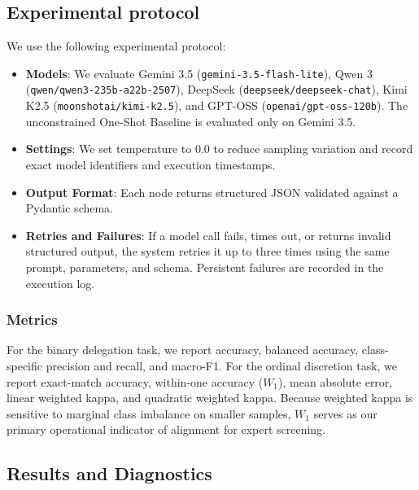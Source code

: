 \documentclass[runningheads]{llncs}
\begin{document}
\subsection{Experimental protocol}

We use the following experimental protocol:
\begin{itemize}[nosep]
    \raggedright
    \item \textbf{Models}: We evaluate Gemini 3.5 (\texttt{gemini-3.5-flash-lite}), Qwen 3 (\texttt{qwen/qwen3-235b-a22b-2507}), DeepSeek (\texttt{deepseek/deepseek-chat}), Kimi K2.5 (\texttt{moonshotai/kimi-k2.5}), and GPT-OSS (\texttt{openai/gpt-oss-120b}). The unconstrained One-Shot Baseline is evaluated only on Gemini 3.5.
    
    \item \textbf{Settings}: We set temperature to 0.0 to reduce sampling variation and record exact model identifiers and execution timestamps.
    
    \item \textbf{Output Format}: Each node returns structured JSON validated against a Pydantic schema.
    
    \item \textbf{Retries and Failures}: If a model call fails, times out, or returns invalid structured output, the system retries it up to three times using the same prompt, parameters, and schema. Persistent failures are recorded in the execution log.
\end{itemize}


\vspace{-0.2cm}
\subsubsection{Metrics}

For the binary delegation task, we report accuracy, balanced accuracy, class-specific precision and recall, and macro-F1. For the ordinal discretion task, we report exact-match accuracy, within-one accuracy ($W_1$), mean absolute error, linear weighted kappa, and quadratic weighted kappa. Because weighted kappa is sensitive to marginal class imbalance on smaller samples, $W_1$ serves as our primary operational indicator of alignment for expert screening.
\vspace{-0.3 cm}
\subsection{Results and Diagnostics}
\vspace{-0.2 cm}
\end{document}
